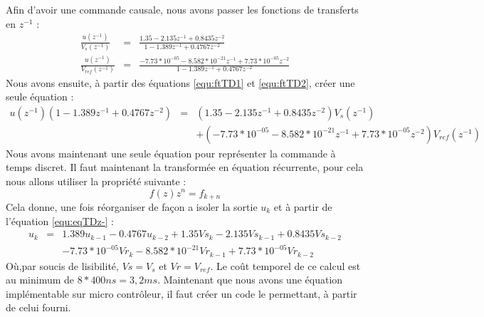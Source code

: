 
Afin d'avoir une commande causale, nous avons passer les fonctions de transferts en $z^{-1}$ :
\begin{eqnarray}
\label{equ:ftTD1}\frac{u(z^{-1})}{V_s(z^{-1})} &=& \frac{1.35  - 2.135 z^{-1} + 0.8435 z^{-2}}{    1 - 1.389 z^{-1} + 0.4767 z^{-2}}\\
\label{equ:ftTD2}\frac{u(z^{-1})}{V_{ref}(z^{-1})}	&=&	\frac{-7.73*10^{-05} - 8.582*10^{-21} z^{-1} + 7.73*10^{-05} z^{-2}}{    1 - 1.389 z^{-1} + 0.4767 z^{-2}}
\end{eqnarray}
Nous avons ensuite, à partir des équations \ref{equ:ftTD1} et  \ref{equ:ftTD2}, créer une seule équation :
\begin{equation}
\label{equ:eqTDz-}
\begin{array}{lcl}
u(z^{-1})(1 - 1.389 z^{-1} + 0.4767 z^{-2}) &=& (1.35  - 2.135 z^{-1} + 0.8435 z^{-2})  V_s(z^{-1}) \\
&&+ (-7.73*10^{-05} - 8.582*10^{-21} z^{-1} + 7.73*10^{-05} z^{-2})V_{ref}(z^{-1})
\end{array}
\end{equation}
Nous avons maintenant une seule équation pour représenter la commande à temps discret.%
Il faut maintenant la transformée en équation récurrente, pour cela nous allons utiliser la propriété suivante :
\begin{equation}
f(z)z^n = f_{k+n}
\end{equation}
Cela donne, une fois réorganiser de façon a isoler la sortie $u_k$ et à partir de l'équation \ref{equ:eqTDz-} :
\begin{equation}
\begin{array}{lcl}
u_k &=&  1.389 u_{k-1} - 0.4767 u_{k-2} + 1.35Vs_{k}  - 2.135 Vs_{k-1} + 0.8435 Vs_{k-2}  \\
&& -7.73*10^{-05}Vr_k - 8.582*10^{-21} Vr_{k-1} + 7.73*10^{-05} Vr_{k-2}
\end{array}
\end{equation}
Où,par soucis de lisibilité, $Vs = V_s$ et $Vr = V_{ref}$.
Le coût temporel de ce calcul est au minimum de $8*400ns = 3,2 ms$.
Maintenant que nous avons une équation implémentable sur micro contrôleur, il faut créer un code le permettant, à partir de celui fourni.